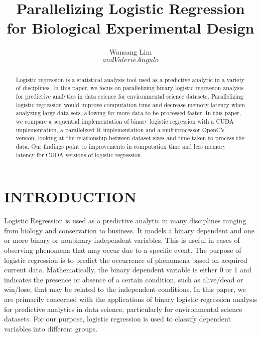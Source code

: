 \documentclass[letterpaper, 10 pt, conference]{ieeeconf}  %
\title{\LARGE \bf
Parallelizing Logistic Regression for Biological Experimental Design
}
\author{Wansang Lim$$ and Valerie Angulo$$%
}
\begin{document}
\maketitle
\thispagestyle{empty}
\pagestyle{empty}


\begin{abstract}
  Logistic regression is a statistical analysis tool used as a predictive analytic in a variety of disciplines. In this paper, we focus on parallelizing binary logistic regression analysis for predictive analytics in data science for environmental science datasets. Parallelizing logistic regression would improve computation time and decrease memory latency when analyzing large data sets, allowing for more data to be processed faster. In this paper, we compare a sequential implementation of binary logistic regression with a CUDA implementation, a parallelized R implementation and a multiprocessor OpenCV version, looking at the relationship between dataset sizes and time taken to process the data. Our findings point to improvements in computation time and less memory latency for CUDA versions of logistic regression.

\end{abstract}


\section{INTRODUCTION}

Logistic Regression is used as a predictive analytic in many disciplines ranging from biology and conservation to business. It models a binary dependent and one or more binary or nonbinary independent variables. This is useful in cases of observing phenomena that may occur due to a specific event. The purpose of logistic regression is to predict the occurrence of phenomena based on acquired current data. Mathematically, the binary dependent variable is either 0 or 1 and indicates the presence or absence of a certain condition, such as alive/dead or win/lose, that may be related to the independent conditions. In this paper, we are primarily concerned with the applications of binary logistic regression analysis for predictive analytics in data science, particularly for environmental science datasets. For our purpose, logistic regression is used to classify dependent variables into different groups. 
\end{document}

